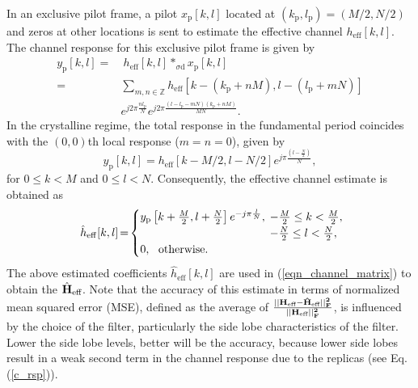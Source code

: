 In an exclusive pilot frame, a pilot $x_{\text{p}}[k,l]$ located at $(k_{\text{p}}, l_{\text{p}})=(M/2, N/2)$ and zeros at other locations is sent to estimate the effective channel $h_{\mathrm{eff}}[k,l]$. The channel response for this exclusive pilot frame is given by 
\begin{align}
y_{\text{p}}[k,l] = & \ h_{\mathrm{eff}}[k,l]*_{\sigma\text{d}}x_{\text{p}}[k,l] \nonumber \\
=&\sum_{m,n\in\mathbb{Z}}h_{\mathrm{eff}}[k-(k_{\text{p}}+nM),l-(l_{\text{p}}+mN)] \nonumber \\
&e^{j2\pi\frac{nl_{\text{p}}}{N}}e^{j2\pi\frac{(l-l_{\text{p}}-mN)(k_{\text{p}}+nM)}{MN}}.
\label{c_rsp2}
\end{align}
In the crystalline regime, the total response in the fundamental period coincides with the $(0,0)$th local response ($m=n=0$), given by 
\begin{equation}
y_{\text{p}}[k,l]=h_{\mathrm{eff}}[k-M/2,l-N/2]e^{j\pi\frac{\left(l-\frac{N}{2}\right)}{N}},
\end{equation}
for $0\leq k<M$ and $0\leq l<N$. Consequently, the effective channel estimate is obtained as 
\begin{eqnarray}
\hat{h}_{\mathrm{eff}}[k,l] \hspace{-0.5mm} = \hspace{-0.5mm}
\begin{cases}
y_{\text{p}}\left[k+\frac{M}{2},l+\frac{N}{2}\right]e^{-j\pi\frac{l}{N}}, & \hspace{-2mm} -\frac{M}{2}\leq k<\frac{M}{2}, \\
& \hspace{-2mm} -\frac{N}{2}\leq l<\frac{N}{2}, \\ 
0, \ \ \mathrm{otherwise}.
\end{cases}
\hspace{-1mm}
\label{eqn:href_est}
\end{eqnarray}
The above estimated coefficients $\hat{h}_{\mathrm{eff}}[k,l]$ are used in (\ref{eqn_channel_matrix}) to obtain the $\hat{\bf H}_\text{eff}$. Note that the accuracy of this estimate in terms of normalized mean squared error (MSE), defined as the average of $\frac{||\bf{H}_{\text{eff}}-\hat{\bf H}_{\text{eff}}||_{F}^{2}}{||\bf{H}_{\text{eff}}||_{F}^{2}}$, is influenced by the choice of the filter, particularly the side lobe characteristics of the filter. Lower the side lobe levels, better will be the accuracy, because lower side lobes result in a weak second term in the channel response due to the replicas (see Eq. (\ref{c_rsp})). 


